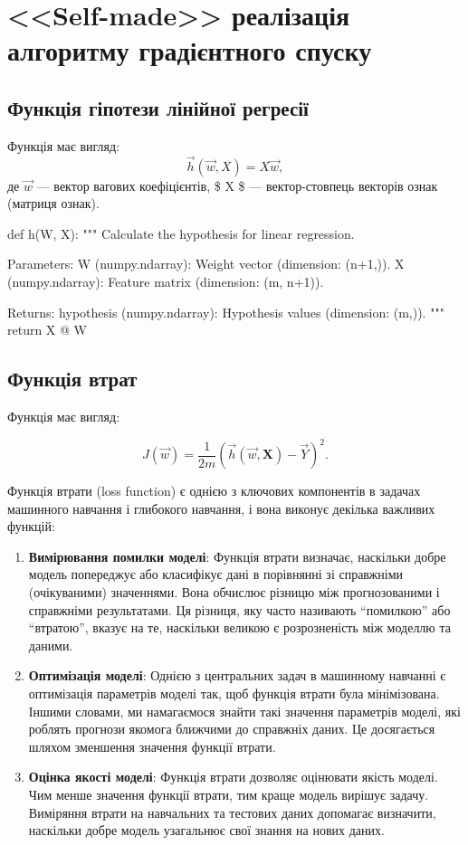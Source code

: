 \documentclass[]{article}
\newcounter{pythoncode}
\begin{document}
\section{<<Self-made>> реалізація алгоритму градієнтного спуску}

\subsection{Функція гіпотези лінійної регресії}
Функція має вигляд: \[ \vec{h}(\vec{w}, X) = X \vec{w}, \] де $ \vec{w}
$ --- вектор вагових коефіцієнтів, \$ X \$ --- вектор-стовпець векторів
ознак (матриця ознак).

\begin{pythoncode}
def h(W, X):
    """
    Calculate the hypothesis for linear regression.

    Parameters:
    W (numpy.ndarray): Weight vector (dimension: (n+1,)).
    X (numpy.ndarray): Feature matrix (dimension: (m, n+1)).

    Returns:
    hypothesis (numpy.ndarray): Hypothesis values (dimension: (m,)).
    """
    return X @ W
\end{pythoncode}

\subsection{Функція втрат}

Функція має вигляд:

\[ J(\vec{w}) = \frac1{2m} \left( \vec{h}(\vec{w}, \mathbf{X}) - \vec{Y} \right)^2. \]

Функція втрати (loss function) є однією з ключових компонентів в задачах
машинного навчання і глибокого навчання, і вона виконує декілька
важливих функцій:

\begin{enumerate}
	\def\labelenumi{\arabic{enumi}.}
	\item
	      \textbf{Вимірювання помилки моделі}: Функція втрати визначає,
	      наскільки добре модель попереджує або класифікує дані в порівнянні зі
	      справжніми (очікуваними) значеннями. Вона обчислює різницю між
	      прогнозованими і справжніми результатами. Ця різниця, яку часто
	      називають ``помилкою'' або ``втратою'', вказує на те, наскільки
	      великою є розрозненість між моделлю та даними.
	\item
	      \textbf{Оптимізація моделі}: Однією з центральних задач в машинному
	      навчанні є оптимізація параметрів моделі так, щоб функція втрати була
	      мінімізована. Іншими словами, ми намагаємося знайти такі значення
	      параметрів моделі, які роблять прогнози якомога ближчими до справжніх
	      даних. Це досягається шляхом зменшення значення функції втрати.
	\item
	      \textbf{Оцінка якості моделі}: Функція втрати дозволяє оцінювати
	      якість моделі. Чим менше значення функції втрати, тим краще модель
	      вирішує задачу. Виміряння втрати на навчальних та тестових даних
	      допомагає визначити, наскільки добре модель узагальнює свої знання на
	      нових даних.
\end{enumerate}
\end{document}
